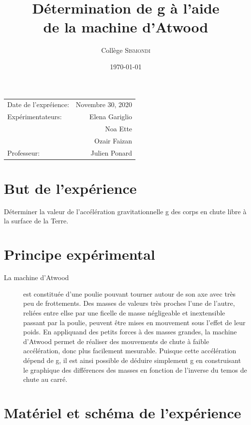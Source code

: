 \documentclass{article}
\title{Détermination de g à l'aide \\ de la machine d'Atwood} %
\author{Collège \textsc{Sismondi}}
\date{\today}
\begin{document}
\maketitle

\begin{center}
    \begin{tabular}{l r}
        Date de l'expréience: & Novembre 30, 2020 \\
        Expérimentateurs:     & Elena Gariglio    \\
                              & Noa Ette          \\
                              & Ozair Faizan      \\
        Professeur:           & Julien Ponard
    \end{tabular}
\end{center}


\section{But de l'expérience}

Déterminer la valeur de l'accélération gravitationnelle g des corps en chute libre à la surface de la Terre.


\section{Principe expérimental}
\label{definitions}
\begin{description}
    \item[La machine d'Atwood]
          est constituée d'une poulie pouvant tourner autour de son axe avec très peu de frottements. Des masses de valeurs très proches l'une de l'autre, reliées entre ellse par une ficelle de masse négligeable et inextensible passant par la poulie, peuvent être mises en mouvement sous l'effet de leur poids. En appliquand des petits forces à des masses grandes, la machine d'Atwood permet de réaliser des mouvements de chute à faible accélération, donc plus facilement mesurable. Puisque cette accélération dépend de g, il est ainsi possible de déduire simplement g en construisant le graphique des différences des masses en fonction de l'inverse du temos de chute au carré.
\end{description}


\section{Matériel et schéma de l'expérience}
\end{document}
